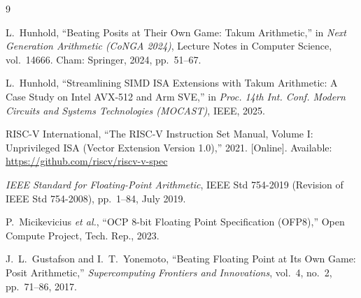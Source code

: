 \documentclass[conference]{IEEEtran}
\begin{document}
\begin{thebibliography}{9}

L.~Hunhold, ``Beating Posits at Their Own Game: Takum Arithmetic,'' in \emph{Next Generation Arithmetic (CoNGA 2024)}, Lecture Notes in Computer Science, vol.~14666. Cham: Springer, 2024, pp.~51--67.

L.~Hunhold, ``Streamlining SIMD ISA Extensions with Takum Arithmetic: A Case Study on Intel AVX-512 and Arm SVE,'' in \emph{Proc. 14th Int. Conf. Modern Circuits and Systems Technologies (MOCAST)}, IEEE, 2025.

RISC-V International, ``The RISC-V Instruction Set Manual, Volume I: Unprivileged ISA (Vector Extension Version 1.0),'' 2021. [Online]. Available: \url{https://github.com/riscv/riscv-v-spec}

\emph{IEEE Standard for Floating-Point Arithmetic}, IEEE Std 754-2019 (Revision of IEEE Std 754-2008), pp.~1--84, July 2019.

P.~Micikevicius \emph{et al.}, ``OCP 8-bit Floating Point Specification (OFP8),'' Open Compute Project, Tech. Rep., 2023.

J.~L.~Gustafson and I.~T.~Yonemoto, ``Beating Floating Point at Its Own Game: Posit Arithmetic,'' \emph{Supercomputing Frontiers and Innovations}, vol.~4, no.~2, pp.~71--86, 2017.

\end{thebibliography}
\end{document}
